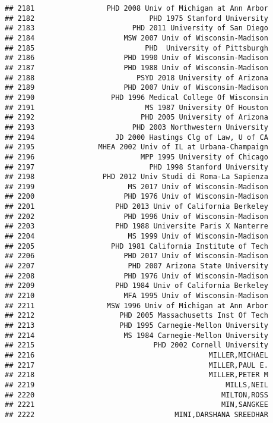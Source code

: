 \documentclass[
]{article}
\begin{document}
\begin{verbatim}
## 2181                 PHD 2008 Univ of Michigan at Ann Arbor
## 2182                           PHD 1975 Stanford University
## 2183                       PHD 2011 University of San Diego
## 2184                     MSW 2007 Univ of Wisconsin-Madison
## 2185                          PHD  University of Pittsburgh
## 2186                     PHD 1990 Univ of Wisconsin-Madison
## 2187                     PHD 1988 Univ of Wisconsin-Madison
## 2188                        PSYD 2018 University of Arizona
## 2189                     PHD 2007 Univ of Wisconsin-Madison
## 2190                  PHD 1996 Medical College Of Wisconsin
## 2191                          MS 1987 University Of Houston
## 2192                         PHD 2005 University of Arizona
## 2193                       PHD 2003 Northwestern University
## 2194                   JD 2000 Hastings Clg of Law, U of CA
## 2195               MHEA 2002 Univ of IL at Urbana-Champaign
## 2196                         MPP 1995 University of Chicago
## 2197                           PHD 1998 Stanford University
## 2198                PHD 2012 Univ Studi di Roma-La Sapienza
## 2199                      MS 2017 Univ of Wisconsin-Madison
## 2200                     PHD 1976 Univ of Wisconsin-Madison
## 2201                   PHD 2013 Univ of California Berkeley
## 2202                     PHD 1996 Univ of Wisconsin-Madison
## 2203                   PHD 1988 Universite Paris X Nanterre
## 2204                      MS 1999 Univ of Wisconsin-Madison
## 2205                  PHD 1981 California Institute of Tech
## 2206                     PHD 2017 Univ of Wisconsin-Madison
## 2207                      PHD 2007 Arizona State University
## 2208                     PHD 1976 Univ of Wisconsin-Madison
## 2209                   PHD 1984 Univ of California Berkeley
## 2210                     MFA 1995 Univ of Wisconsin-Madison
## 2211                 MSW 1996 Univ of Michigan at Ann Arbor
## 2212                    PHD 2005 Massachusetts Inst Of Tech
## 2213                    PHD 1995 Carnegie-Mellon University
## 2214                     MS 1984 Carnegie-Mellon University
## 2215                            PHD 2002 Cornell University
## 2216                                         MILLER,MICHAEL
## 2217                                         MILLER,PAUL E.
## 2218                                         MILLER,PETER M
## 2219                                             MILLS,NEIL
## 2220                                            MILTON,ROSS
## 2221                                            MIN,SANGKEE
## 2222                                 MINI,DARSHANA SREEDHAR

\end{verbatim}
\end{document}
